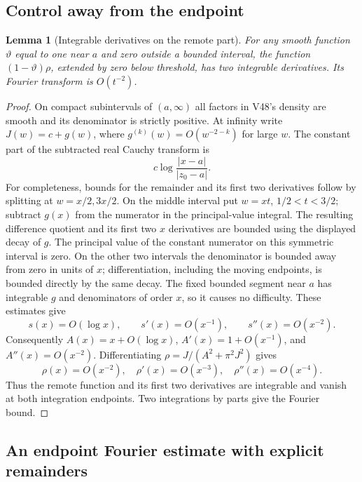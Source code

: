 \documentclass[11pt]{article}
\newtheorem{lemma}[theorem]{Lemma}
\theoremstyle{remark}
\begin{document}
\subsection{Control away from the endpoint}

\begin{lemma}[Integrable derivatives on the remote part]
\label{lem:v20v49-remote}
For any smooth function \(\vartheta\) equal to one near \(a\)
and zero outside a bounded interval, the function
\((1-\vartheta)\rho\), extended by zero below threshold, has
two integrable derivatives.  Its Fourier transform is \(O(t^{-2})\).
\end{lemma}
\begin{proof}
On compact subintervals of \((a,\infty)\) all factors in
V48's density are smooth and its denominator is strictly positive.
At infinity write \(J(w)=c+g(w)\), where
\(g^{(k)}(w)=O(w^{-2-k})\) for large \(w\).
The constant part of the subtracted real Cauchy transform is
\[
 c\log\frac{|x-a|}{|z_0-a|}.
\]
For completeness, bounds for the remainder and its first two
derivatives follow by splitting at \(w=x/2,3x/2\).
On the middle interval put \(w=xt\), \(1/2<t<3/2\);
subtract \(g(x)\) from the numerator in the principal-value
integral.  The resulting difference quotient and its first
two \(x\) derivatives are bounded using the displayed decay
of \(g\).  The principal value of the constant numerator on
this symmetric interval is zero.
On the other two intervals the denominator is bounded away
from zero in units of \(x\); differentiation, including the
moving endpoints, is bounded directly by the same decay.
The fixed bounded segment near \(a\) has integrable \(g\)
and denominators of order \(x\), so it causes no difficulty.
These estimates give
\[
 s(x)=O(\log x),\qquad s'(x)=O(x^{-1}),\qquad
 s''(x)=O(x^{-2}).
\]
Consequently \(A(x)=x+O(\log x)\), \(A'(x)=1+O(x^{-1})\),
and \(A''(x)=O(x^{-2})\).  Differentiating
\(\rho=J/(A^2+\pi^2J^2)\) gives
\[
 \rho(x)=O(x^{-2}),\quad \rho'(x)=O(x^{-3}),\quad
 \rho''(x)=O(x^{-4}).
\]
Thus the remote function and its first two derivatives are
integrable and vanish at both integration endpoints.
Two integrations by parts give the Fourier bound.
\end{proof}

\subsection{An endpoint Fourier estimate with explicit remainders}
\end{document}
